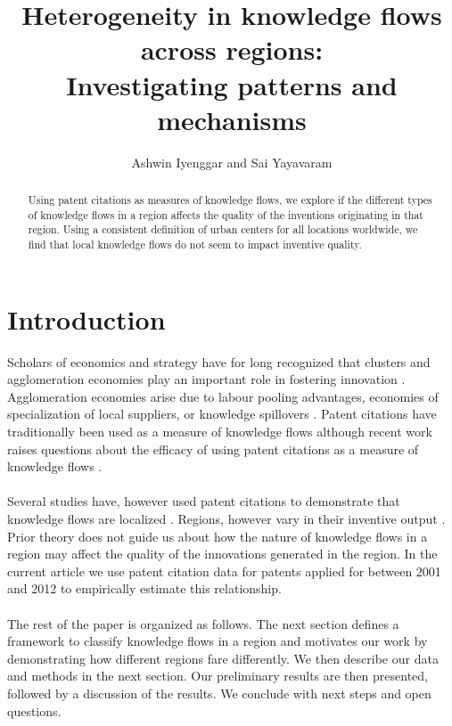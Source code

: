 \documentclass[12pt]{article}
\begin{document}
\title{Heterogeneity in knowledge flows across regions:\\ Investigating patterns and mechanisms}
\author{Ashwin Iyenggar and Sai Yayavaram} 

\maketitle
\thispagestyle{empty}
\begin{abstract}
\noindent Using patent citations as measures of knowledge flows, we explore if the different types of knowledge flows in a region affects the quality of the inventions originating in that region. Using a consistent definition of urban centers for all locations worldwide, we find that local knowledge flows do not seem to impact inventive quality. 
\end{abstract}

\section*{Introduction}
Scholars of economics and strategy have for long recognized that clusters and agglomeration economies play an important role in fostering innovation \citep{Marshall1890, Porter1990}. Agglomeration economies arise due to labour pooling advantages, economies of specialization of local suppliers, or knowledge spillovers \citep{Krugman1991}. Patent citations have traditionally been used as a  measure of knowledge flows \citep{Jaffe1993} although recent work raises questions about the efficacy of using patent citations as a measure of knowledge flows \citep{Arora2017}. 
\\\\
Several studies have, however used patent citations to demonstrate that knowledge flows are localized \citep{Jaffe1993, Almeida1999, Alcacer2006a}. Regions, however vary in their inventive output \citep{Agrawal2014}. Prior theory does not guide us about how the nature of knowledge flows in a region may affect the quality of the innovations generated in the region. In the current article we use patent citation data for patents applied for between 2001 and 2012 to empirically estimate this relationship. 
\\\\
The rest of the paper is organized as follows. The next section defines a framework to classify knowledge flows in a region and motivates our work by demonstrating how different regions fare differently. We then describe our data and methods in the next section. Our preliminary results are then presented, followed by a discussion of the results. We conclude with next steps and open questions.
\end{document}
